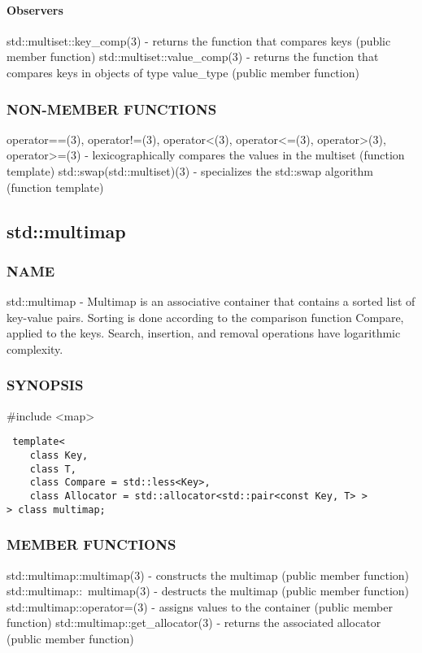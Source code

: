 \paragraph{Observers}
std::multiset::key\_comp(3) - returns the function that compares keys  (public member function)
std::multiset::value\_comp(3) - returns the function that compares keys in objects of type value\_type  (public member function)

\subsubsection{NON-MEMBER FUNCTIONS}
operator==(3), operator!=(3), operator<(3), operator<=(3), operator>(3), operator>=(3) - lexicographically compares the values in the multiset   (function template)
std::swap(std::multiset)(3) - specializes the std::swap algorithm   (function template)


\subsection{std::multimap}

\subsubsection{NAME}
std::multimap - Multimap is an associative container that contains a sorted list of key-value pairs. Sorting is done according to the comparison function Compare, applied to the keys. Search, insertion, and removal operations have logarithmic complexity.

\subsubsection{SYNOPSIS}
\#include <map>

\begin{lstlisting}
 template<
    class Key,
    class T,
    class Compare = std::less<Key>,
    class Allocator = std::allocator<std::pair<const Key, T> >
> class multimap;
\end{lstlisting}

\subsubsection{MEMBER FUNCTIONS}
std::multimap::multimap(3) - constructs the multimap  (public member function)
std::multimap::~multimap(3) - destructs the multimap  (public member function)
std::multimap::operator=(3) - assigns values to the container   (public member function)
std::multimap::get\_allocator(3) - returns the associated allocator   (public member function)
